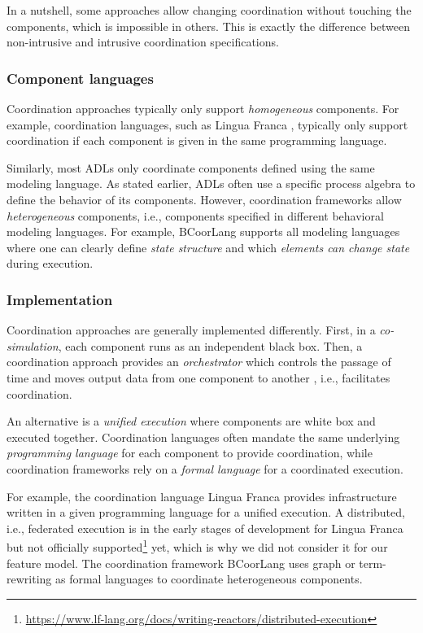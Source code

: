 \documentclass[runningheads]{llncs}
\begin{document}
In a nutshell, some approaches allow changing coordination without touching the components, which is impossible in others.
This is exactly the difference between non-intrusive and intrusive coordination specifications.

\subsubsection{Component languages} Coordination approaches typically only support \textit{homogeneous} components.
For example, coordination languages, such as Lingua Franca \cite{lohstrohReactorsDeterministicModel2020}, typically only support coordination if each component is given in the same programming language.

Similarly, most ADLs only coordinate components defined using the same modeling language.
As stated earlier, ADLs often use a specific process algebra to define the behavior of its components.
However, coordination frameworks allow \textit{heterogeneous} components, i.e., components specified in different behavioral modeling languages.
For example, BCoorLang \cite{krauterBehavioralConsistencyMultimodeling2023} supports all modeling languages where one can clearly define \textit{state structure} and which \textit{elements can change state} during execution.

\subsubsection{Implementation} Coordination approaches are generally implemented differently.
First, in a \textit{co-simulation}, each component runs as an independent black box.
Then, a coordination approach provides an \textit{orchestrator} which controls the passage of time and moves output data from one component to another \cite{gomesCoSimulationSurvey2019}, i.e., facilitates coordination.

An alternative is a \textit{unified execution} where components are white box and executed together.
Coordination languages often mandate the same underlying \textit{programming language} for each component to provide coordination, while coordination frameworks rely on a \textit{formal language} for a coordinated execution.

For example, the coordination language Lingua Franca \cite{lohstrohReactorsDeterministicModel2020} provides infrastructure written in a given programming language for a unified execution.
A distributed, i.e., federated execution is in the early stages of development for Lingua Franca but not officially supported\footnote{\url{https://www.lf-lang.org/docs/writing-reactors/distributed-execution}} yet, which is why we did not consider it for our feature model.
The coordination framework BCoorLang \cite{krauterBehavioralConsistencyMultimodeling2023} uses graph or term-rewriting as formal languages to coordinate heterogeneous components.
\end{document}
